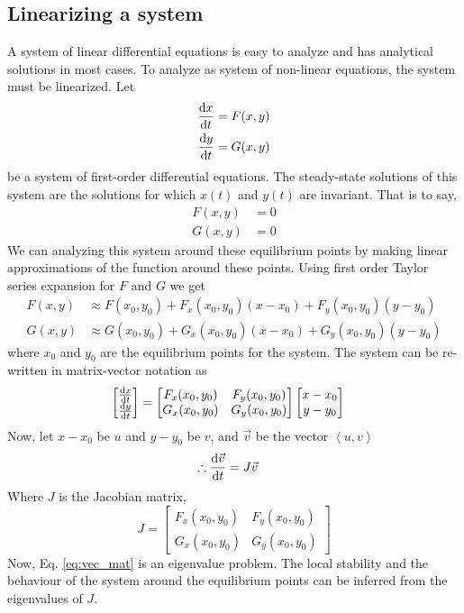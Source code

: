 \documentclass[12pt,1in]{article}
\begin{document}
\subsection{Linearizing a system}
A system of linear differential equations is easy to analyze and has analytical solutions in most cases. To analyze as system of non-linear equations, the system must be linearized. 
Let 
\begin{align}
\derivative{x}{t} &= F(x, y) \\
\derivative{y}{t} &= G(x , y)
\end{align}
be a system of first-order differential equations. The steady-state solutions of this system are the solutions for which  $x(t)$ and $y(t)$ are invariant. That is to say,
\begin{align}
    F(x,y) &= 0 \\
    G(x,y) &= 0
\end{align}
We can analyzing this system around these equilibrium points by making linear approximations of the function around these points. Using first order Taylor series expansion for $F$ and $G$ we get
\begin{align}
    F(x,y) &\approx F(x_0, y_0) + F_x(x_0, y_0)(x - x_0) + F_y(x_0, y_0)(y - y_0) \\
    G(x,y) &\approx G(x_0, y_0) + G_x(x_0, y_0)(x - x_0) + G_y(x_0, y_0)(y - y_0)
\end{align}
where $x_0$ and $y_0$ are the equilibrium points for the system. The system can be re-written in matrix-vector notation as 
\begin{align}
    \begin{bmatrix}
    \derivative{x}{t} \\
    \derivative{y}{t}
    \end{bmatrix} &= 
    \begin{bmatrix}
    F_x(x_0, y_0) & F_y(x_0, y_0)\\
    G_x(x_0, y_0) & G_y(x_0, y_0)
    \end{bmatrix}
    \begin{bmatrix}
    x - x_0 \\
    y - y_0
    \end{bmatrix}
\end{align}Now, let $x - x_0$ be $u$ and $y - y_0$ be $v$, and $\Vec{v}$ be the vector $\left<u ,v\right>$
\begin{align}
    \therefore \derivative{\Vec{v}}{t} &= J\Vec{v} \label{eq:vec_mat}
\end{align}
Where $J$ is the Jacobian matrix, $$J = \begin{bmatrix}
    F_x(x_0, y_0) & F_y(x_0, y_0)\\
    G_x(x_0, y_0) & G_y(x_0, y_0)
    \end{bmatrix}$$
Now, Eq. \ref{eq:vec_mat} is an eigenvalue problem. The local stability and the behaviour of the system around the equilibrium points can be inferred from the eigenvalues of $J$. 
\end{document}

